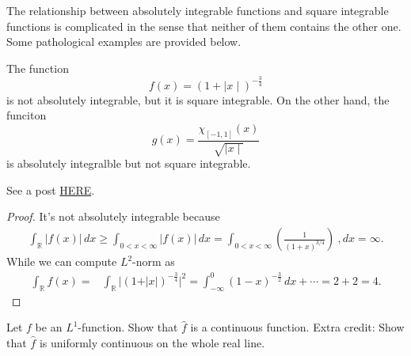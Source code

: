 The relationship between absolutely integrable functions and square integrable functions is complicated in the sense that neither of them contains the other one. Some pathological examples are provided below.
\begin{Example}[Example 4.2.7.]
The function \[f(x)=(1+\mid x\mid)^{-\frac{3}{4}}\] is not absolutely integrable, but it is square integrable. On the other hand, the funciton \[g(x)=\frac{\chi_{[-1,1]}(x)}{\sqrt{\mid x\mid}}\] is absolutely integralble but not square integrable.

See a post \href{https://math.stackexchange.com/questions/18395/what-functions-or-classes-of-functions-are-l1-but-not-l2}{HERE}.

\begin{proof}
    It's not absolutely integrable because 
    \begin{align*}
        \int_{\mathbb R} \vert f(x)\vert \, dx \geq \int_{0 < x < \infty} \vert f(x)\vert \,dx=\int_{0 < x < \infty} \left(\frac{1}{(1+x)^{3/4}}\right)\ ,dx = \infty.
    \end{align*}
    While we can compute $L^2$-norm as 
    \begin{align*}
    \int_{\mathbb R} f(x) =& \int_{\mathbb R}\vert \left( 1+ \vert x\vert \right)^{-\frac{3}{4}}\vert^2
    = \int_{-\infty}^0 (1-x)^{-\frac{3}{2}} \,dx + \cdots
    = 2+2 =4.
\end{align*} 


\end{proof}


\end{Example}



\begin{exercise}[Exercise 4.2.9.]
Let $f$ be an $L^1$-function. Show that $\hat{f}$ is a continuous function. Extra credit: Show that $\hat{f}$ is uniformly continuous on the whole real line.
\end{exercise}